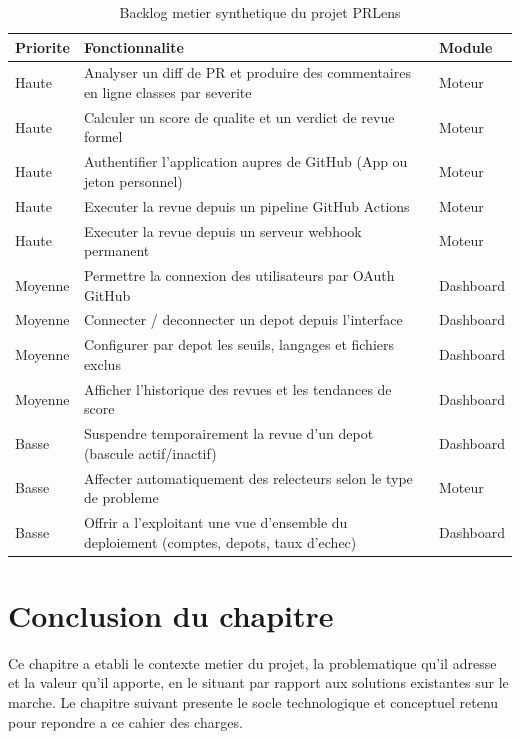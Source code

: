 \documentclass[a4paper,12pt,oneside]{report}
\newcommand{\tablesetup}{\small\singlespacing\renewcommand{\arraystretch}{1.25}}
\begin{document}
\begin{table}[H]
\centering
\tablesetup
\begin{tabular}{L{1.6cm}L{9.4cm}L{2.3cm}}
\toprule
\textbf{Priorite} & \textbf{Fonctionnalite} & \textbf{Module} \\
\midrule
Haute & Analyser un diff de PR et produire des commentaires en ligne classes par severite & Moteur \\
Haute & Calculer un score de qualite et un verdict de revue formel & Moteur \\
Haute & Authentifier l'application aupres de GitHub (App ou jeton personnel) & Moteur \\
Haute & Executer la revue depuis un pipeline GitHub Actions & Moteur \\
Haute & Executer la revue depuis un serveur webhook permanent & Moteur \\
Moyenne & Permettre la connexion des utilisateurs par OAuth GitHub & Dashboard \\
Moyenne & Connecter / deconnecter un depot depuis l'interface & Dashboard \\
Moyenne & Configurer par depot les seuils, langages et fichiers exclus & Dashboard \\
Moyenne & Afficher l'historique des revues et les tendances de score & Dashboard \\
Basse & Suspendre temporairement la revue d'un depot (bascule actif/inactif) & Dashboard \\
Basse & Affecter automatiquement des relecteurs selon le type de probleme & Moteur \\
Basse & Offrir a l'exploitant une vue d'ensemble du deploiement (comptes, depots, taux d'echec) & Dashboard \\
\bottomrule
\end{tabular}
\caption{Backlog metier synthetique du projet PRLens}
\label{tab:backlog}
\end{table}

\section*{Conclusion du chapitre}

Ce chapitre a etabli le contexte metier du projet, la problematique qu'il adresse et la valeur qu'il apporte, en le situant par rapport aux solutions existantes sur le marche. Le chapitre suivant presente le socle technologique et conceptuel retenu pour repondre a ce cahier des charges.
\end{document}

